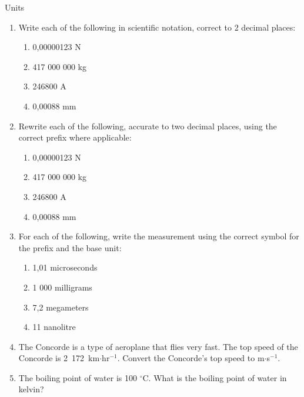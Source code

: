 \begin{eocexercises}{Units}
\begin{enumerate}[noitemsep, label=\textbf{\arabic*}. ]
\begin{enumerate}[noitemsep, label=\textbf{\alph*}. ]
\end{enumerate}
                \label{m30853*uid78}\item Write each of the following in scientific notation, correct to 2 decimal places:
\label{m30853*id68302}\begin{enumerate}[noitemsep, label=\textbf{\alph*}. ] 
            \label{m30853*uid79}\item 0,00000123 N
\label{m30853*uid80}\item 417 000 000 kg
\label{m30853*uid81}\item 246800 A
\label{m30853*uid82}\item 0,00088 mm
\end{enumerate}
                \label{m30853*uid83}\item Rewrite each of the following, accurate to two decimal places, using the correct prefix where applicable:
\label{m30853*id68367}\begin{enumerate}[noitemsep, label=\textbf{\alph*}. ] 
            \label{m30853*uid84}\item 0,00000123 N
\label{m30853*uid85}\item 417 000 000 kg
\label{m30853*uid86}\item 246800 A
\label{m30853*uid87}\item 0,00088 mm
\end{enumerate}
                \label{m30853*uid88}\item For each of the following, write the measurement using the correct symbol for the prefix and the base unit:
\label{m30853*id68433}\begin{enumerate}[noitemsep, label=\textbf{\alph*}. ] 
            \label{m30853*uid89}\item 1,01 microseconds
\label{m30853*uid90}\item 1 000 milligrams
\label{m30853*uid91}\item 7,2 megameters
\label{m30853*uid92}\item 11 nanolitre
\end{enumerate}
                \label{m30853*uid93}\item The Concorde is a type of aeroplane that flies very fast. The top speed of the Concorde is 2~172~km$\ensuremath{\cdot}$hr${}^{-1}$. Convert the Concorde's top speed to m$\ensuremath{\cdot}$s${}^{-1}$.        
\label{m30853*uid94}\item The boiling point of water is 100 ${}^{\circ }$C. What is the boiling point of water in kelvin?        
\end{enumerate}

\end{eocexercises}
